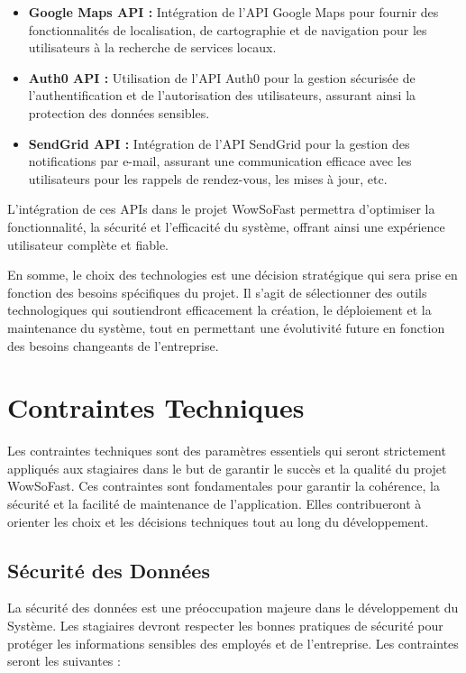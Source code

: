{\begin{itemize}
    \item \textbf{Google Maps API :} Intégration de l'API Google Maps pour fournir des fonctionnalités de localisation, de cartographie et de navigation pour les utilisateurs à la recherche de services locaux.
    
    \item \textbf{Auth0 API :} Utilisation de l'API Auth0 pour la gestion sécurisée de l'authentification et de l'autorisation des utilisateurs, assurant ainsi la protection des données sensibles.
    
    \item \textbf{SendGrid API :} Intégration de l'API SendGrid pour la gestion des notifications par e-mail, assurant une communication efficace avec les utilisateurs pour les rappels de rendez-vous, les mises à jour, etc.
\end{itemize}

\vspace{0.5cm}

L'intégration de ces APIs dans le projet WowSoFast permettra d'optimiser la fonctionnalité, la sécurité et l'efficacité du système, offrant ainsi une expérience utilisateur complète et fiable.

\vspace{0.5cm}

En somme, le choix des technologies est une décision stratégique qui sera prise en fonction des besoins spécifiques du projet. Il s'agit de sélectionner des outils technologiques qui soutiendront efficacement la création, le déploiement et la maintenance du système, tout en permettant une évolutivité future en fonction des besoins changeants de l'entreprise.

\section{Contraintes Techniques}
Les contraintes techniques sont des paramètres essentiels qui seront strictement appliqués aux stagiaires dans le but de garantir le succès et la qualité du projet WowSoFast. Ces contraintes sont fondamentales pour garantir la cohérence, la sécurité et la facilité de maintenance de l'application. Elles contribueront à orienter les choix et les décisions techniques tout au long du développement.

\subsection{Sécurité des Données}
La sécurité des données est une préoccupation majeure dans le développement du Système. Les stagiaires devront respecter les bonnes pratiques de sécurité pour protéger les informations sensibles des employés et de l'entreprise. Les contraintes seront les suivantes :

}
